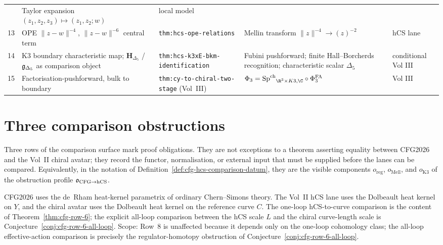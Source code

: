 {\begin{center}
\begin{tabular}{p{0.7cm}p{3.5cm}p{3.3cm}p{3.3cm}p{1.9cm}}
 & Taylor expansion $(z_1,z_2,z_3)\mapsto(z_1,z_2;w)$
 & local model \\
13 & OPE $\|z-w\|^{-4}$, $\|z-w\|^{-6}$ central term
 & \texttt{thm:hcs-ope-relations}
 & Mellin transform $\|z\|^{-4}\to (z)^{-2}$
 & hCS lane \\
14 & K3 boundary characteristic map; $\mathbf H_{\Delta_5}$ /
$\mathfrak{g}_{\Delta_5}$ as comparison object
 & \texttt{thm:hcs-k3xE-bkm-identification}
 & Fubini pushforward; finite Hall--Borcherds recognition;
 characteristic scalar $\Delta_5$
 & conditional Vol III \\
15 & Factorisation-pushforward, bulk to boundary
 & \texttt{thm:cy-to-chiral-two-stage} (Vol~III)
 & $\Phi_3 = {\SpCh}_{\R^3\times K3,\C}\circ\PhiFA_3$
 & Vol III \\
\bottomrule
\end{tabular}
\end{center}
}

\section{Three comparison obstructions}
\label{sec:cfg-imperfect-rows}

Three rows of the comparison surface mark proof obligations. They are
not exceptions to a theorem asserting equality between CFG2026 and the
Vol~II chiral avatar; they record the functor, normalisation, or
external input that must be supplied before the lanes can be compared.
Equivalently, in the notation of
Definition~\ref{def:cfg-hcs-comparison-datum}, they are the visible
components \(o_{\mathrm{reg}}\), \(o_{\mathrm{Mell}}\), and
\(o_{\mathrm{K3}}\) of the obstruction profile
\(\mathfrak o_{\mathrm{CFG}\to\mathrm{hCS}}\).

\begin{remark}
\label{rem:cfg-imperfect-row-6}
CFG2026 uses the de~Rham heat-kernel parametrix of ordinary
Chern--Simons theory. The Vol~II hCS lane uses the Dolbeault heat
kernel on $Y$, and the chiral avatar uses the Dolbeault heat kernel on
the reference curve $C$. The one-loop hCS-to-curve comparison is the
content of Theorem~\ref{thm:cfg-row-6}; the explicit all-loop
comparison between the hCS scale $L$ and the chiral curve-length scale
is Conjecture~\ref{conj:cfg-row-6-all-loop}. Scope: Row~8 is unaffected
because it depends only on the one-loop cohomology class; the all-loop
effective-action comparison is precisely the regulator-homotopy
obstruction of Conjecture~\ref{conj:cfg-row-6-all-loop}.
\end{remark}

